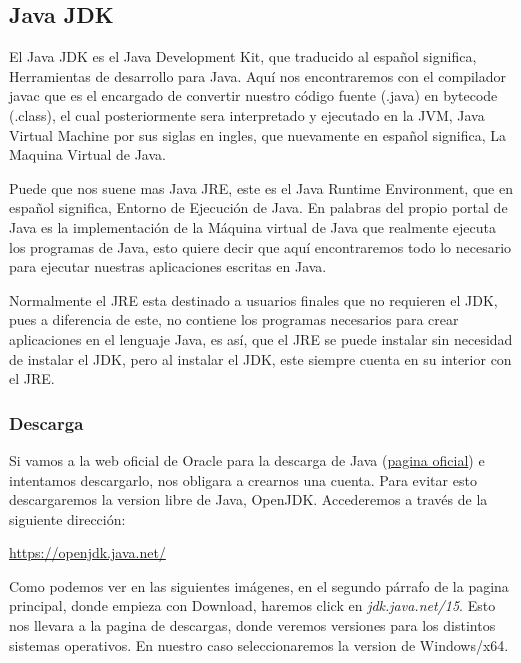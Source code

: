 \documentclass[a4paper,10pt]{article}
\begin{document}
 \clearpage

\subsection{Java JDK}

El Java JDK es el Java Development Kit, que traducido al español significa, Herramientas de desarrollo para Java. Aquí nos encontraremos con el compilador javac que es el encargado de convertir nuestro código fuente (.java) en bytecode (.class), el cual posteriormente sera interpretado y ejecutado en la JVM, Java Virtual Machine por sus siglas en ingles, que nuevamente en español significa, La Maquina Virtual de Java. 

Puede que nos suene mas Java JRE, este es el Java Runtime Environment, que en español significa, Entorno de Ejecución de Java. En palabras del propio portal de Java es la implementación de la Máquina virtual de Java que realmente ejecuta los programas de Java, esto quiere decir que aquí encontraremos todo lo necesario para ejecutar nuestras aplicaciones escritas en Java. 

Normalmente el JRE esta destinado a usuarios finales que no requieren el JDK, pues a diferencia de este, no contiene los programas necesarios para crear aplicaciones en el lenguaje Java, es así, que el JRE se puede instalar sin necesidad de instalar el JDK, pero al instalar el JDK, este siempre cuenta en su interior con el JRE.

\subsubsection{Descarga}

Si vamos a la web oficial de Oracle para la descarga de Java (\href{https://www.oracle.com/es/java/technologies/javase/javase-jdk8-downloads.html}{pagina oficial}) e intentamos descargarlo, nos obligara a crearnos una cuenta. Para evitar esto descargaremos la version libre de Java, OpenJDK. Accederemos a través de la siguiente dirección:

\begin{center}
\href{https://openjdk.java.net/}{https://openjdk.java.net/} 
\end{center}


Como podemos ver en las siguientes imágenes, en el segundo párrafo de la pagina principal, donde empieza con Download, haremos click  en \textit{jdk.java.net/15}. Esto nos llevara a la pagina de descargas, donde veremos versiones para los distintos sistemas operativos. En nuestro caso seleccionaremos la version de Windows/x64.
\end{document}
